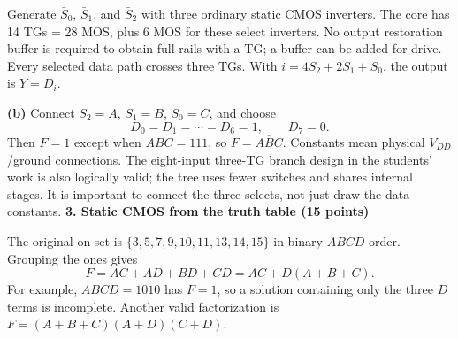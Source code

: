 \documentclass[10pt]{article}
\newcommand{\hm}[4]{\begin{scope}[shift={(#1,#2)}]
\draw(-.24,0)--(.24,0);\draw(-.2,0)--(-.2,-.25)--(-.5,-.25);
\draw(.2,0)--(.2,-.25)--(.5,-.25);\draw(-.23,.16)--(.23,.16);
\ifnum#4=1\draw(0,.26)circle(.06);\draw(0,.32)--(0,.75);\else\draw(0,.16)--(0,.75);\fi
\node[font=\scriptsize,above right]at(.30,.05){$#3$};\end{scope}}
\begin{document}
\begin{center}\end{center}
Generate $\bar S_0$, $\bar S_1$, and $\bar S_2$ with three ordinary static CMOS inverters. The core has 14 TGs = 28 MOS, plus 6 MOS for these select inverters. No output restoration buffer is required to obtain full rails with a TG; a buffer can be added for drive. Every selected data path crosses three TGs. With $i=4S_2+2S_1+S_0$, the output is $Y=D_i$.

\textbf{(b)} Connect $S_2=A$, $S_1=B$, $S_0=C$, and choose
\[D_0=D_1=\cdots=D_6=1,\qquad D_7=0.\]
Then $F=1$ except when $ABC=111$, so $F=\overline{ABC}$. Constants mean physical $V_{DD}$/ground connections. The eight-input three-TG branch design in the students' work is also logically valid; the tree uses fewer switches and shares internal stages. It is important to connect the three selects, not just draw the data constants.
\newpage
\textbf{3. Static CMOS from the truth table (15 points)}

The original on-set is $\{3,5,7,9,10,11,13,14,15\}$ in binary $ABCD$ order. Grouping the ones gives
\[\boxed{F=AC+AD+BD+CD=AC+D(A+B+C).}\]
For example, $ABCD=1010$ has $F=1$, so a solution containing only the three $D$ terms is incomplete. Another valid factorization is $F=(A+B+C)(A+D)(C+D)$.
\end{document}
